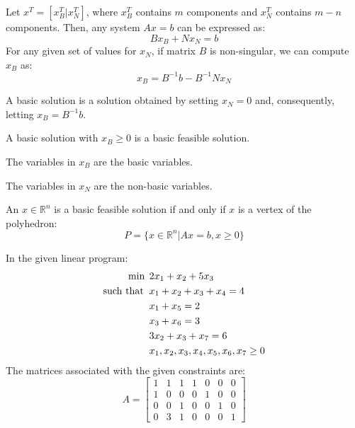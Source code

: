 \begin{property}
Let $x^T=\left[x_B^T | x_N^T\right]$, where $x_B^T$ contains  $m$ components and $x_N^T$ contains  $m-n$ components. 
Then, any system $Ax = b$ can be expressed as:
\[Bx_B+Nx_N=b\]
For any given set of values for $x_N$, if matrix  $B$ is non-singular, we can compute $x_B$ as:
\[x_B=B^{-1}b-B^{-1}Nx_N\]
\begin{definition}
    A basic solution is a solution obtained by setting $x_N=0$ and, consequently, letting $x_B=B^{-1}b$.
\end{definition}
\begin{definition}
    A basic solution with $x_B \geq 0$ is a basic feasible solution.
\end{definition}
\begin{definition}
    The variables in $x_B$ are the basic variables.
\end{definition}
\begin{definition}
    The variables in $x_N$ are the non-basic variables.
\end{definition}
\begin{theorem}
    An $x \in \mathbb{R}^n$ is a basic feasible solution if and only if $x$ is a vertex of the polyhedron:
    \[P=\{x \in \mathbb{R}^n|Ax=b,x \geq 0\}\]
\end{theorem}
\begin{example}
    In the given linear program:
    \begin{align*}
        \min                      \:&\: 2x_1+x_2+5x_3          \\
        \textnormal{such that }     &\: x_1+x_2+x_3+x_4=4  \\
                                    &\: x_1+x_5=2  \\
                                    &\: x_3+x_6=3 \\
                                    &\: 3x_2+x_3+x_7=6  \\
                                    &\: x_1,x_2,x_3,x_4,x_5,x_6,x_7 \geq 0
    \end{align*}
    The matrices associated with the given constraints are:
    \[
    A=
    \begin{bmatrix}
        1 & 1 & 1 & 1 & 0 & 0 & 0 \\
        1 & 0 & 0 & 0 & 1 & 0 & 0 \\
        0 & 0 & 1 & 0 & 0 & 1 & 0 \\
        0 & 3 & 1 & 0 & 0 & 0 & 1

\end{bmatrix}\]
\end{example}
\end{property}
